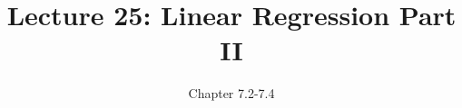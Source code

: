 \documentclass[slides]{beamer}
\title{Lecture 25: Linear Regression Part II}
\author{Chapter 7.2-7.4}
\date{}
\newcommand{\blue}[1]{\textcolor{blue2}{#1}}
\begin{document}
\begin{frame}
\titlepage
\end{frame}


%
%


%
%
%
\end{document}
